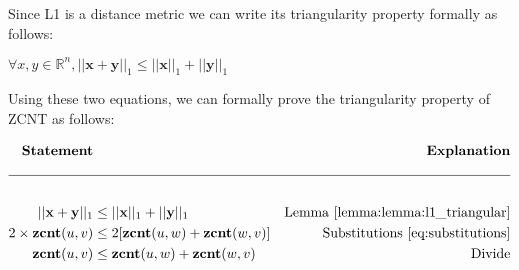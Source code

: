 Since L1 is a distance metric we can write its triangularity property formally as follows: 

\begin{lemma}\label{lemma:l1_triangular}
    $\forall x, y \in \mathbb{R}^n, ||\mathbf x + \mathbf y||_1 \leq ||\mathbf x||_1 + ||\mathbf y||_1$
\end{lemma}

Using these two equations, we can formally prove the triangularity property of ZCNT as follows: 

\begin{align*}
    \textbf{Statement} & & \textbf{Explanation} \\
    \cline{1-3} \\
    ||\mathbf x + \mathbf y||_1 & \leq ||\mathbf x||_1 + ||\mathbf y||_1 & \text{Lemma}~\ref{lemma:lemma:l1_triangular} \\ 
    2 \times \zcnt(u, v) & \leq 2[\zcnt(u, w) + \zcnt(w, v)] & \text{Substitutions~\ref{eq:substitutions}} \\ 
    \zcnt(u, v) &\leq \zcnt(u, w) + \zcnt(w, v) & \text{Divide}
\end{align*}